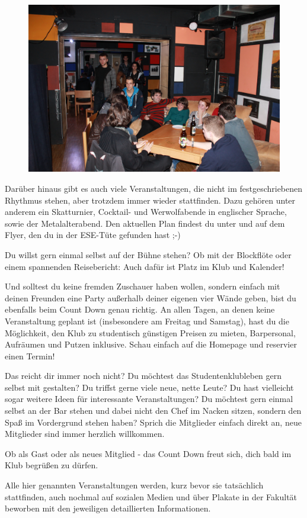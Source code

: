 \begin{figure}%
  \vspace{-.4cm}
  \hspace{.03\linewidth}\includegraphics[width=.96\linewidth]{img/ese2013/cd.jpg}
  \vspace{-.4cm}
\end{figure}

Darüber hinaus gibt es auch viele Veranstaltungen, die nicht im festgeschriebenen Rhythmus stehen, aber trotzdem immer wieder stattfinden.
Dazu gehören unter anderem ein Skatturnier, Cocktail- und Werwolfabende in englischer Sprache, sowie der Metalalterabend.
Den aktuellen Plan findest du unter  und auf dem Flyer, den du in der ESE-Tüte gefunden hast ;-)

Du willst gern einmal selbst auf der Bühne stehen?
Ob mit der Blockflöte oder einem spannenden Reisebericht:
Auch dafür ist Platz im Klub und Kalender!

Und solltest du keine fremden Zuschauer haben wollen, sondern einfach mit deinen Freunden eine Party außerhalb deiner eigenen vier Wände geben, bist du ebenfalls beim Count Down genau richtig.
An allen Tagen, an denen keine Veranstaltung geplant ist (insbesondere am Freitag und Samstag), hast du die Möglichkeit, den Klub zu studentisch günstigen Preisen zu mieten, Barpersonal, Aufräumen und Putzen inklusive.
Schau einfach auf die Homepage und reservier einen Termin!

Das reicht dir immer noch nicht?
Du möchtest das Studentenklubleben gern selbst mit gestalten?
Du triffst gerne viele neue, nette Leute?
Du hast vielleicht sogar weitere Ideen für interessante Veranstaltungen?
Du möchtest gern einmal selbst an der Bar stehen und dabei nicht den Chef im Nacken sitzen, sondern den Spaß im Vordergrund stehen haben?
Sprich die Mitglieder einfach direkt an, neue Mitglieder sind immer herzlich willkommen.

Ob als Gast oder als neues Mitglied - das Count Down freut sich, dich bald im Klub begrüßen zu dürfen.


Alle hier genannten Veranstaltungen werden, kurz bevor sie tatsächlich stattfinden, auch nochmal auf sozialen Medien und über Plakate in der Fakultät beworben mit den jeweiligen detaillierten Informationen.
